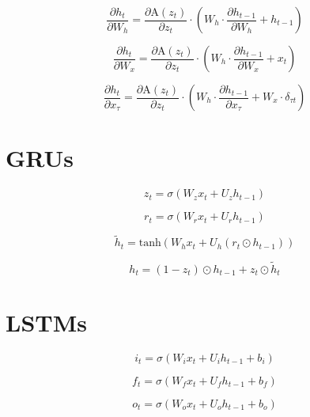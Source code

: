 \documentclass{article}
\begin{document}
\begin{equation}
\frac{\partial h_t}{\partial W_h} = \frac{\partial \text{A}(z_t)}{\partial z_t} \cdot \left( W_h \cdot \frac{\partial h_{t-1}}{\partial W_h} + h_{t-1} \right)
\end{equation}

\begin{equation}
\frac{\partial h_t}{\partial W_x} = \frac{\partial \text{A}(z_t)}{\partial z_t} \cdot \left( W_h \cdot \frac{\partial h_{t-1}}{\partial W_x} + x_t \right)
\end{equation}

\begin{equation}
\frac{\partial h_t}{\partial x_\tau} = \frac{\partial \text{A}(z_t)}{\partial z_t} \cdot \left( W_h \cdot \frac{\partial h_{t-1}}{\partial x_\tau} + W_x \cdot \delta_{\tau t} \right)
\end{equation}

\section{GRUs}

\begin{equation}
z_t = \sigma(W_z x_t + U_z h_{t-1})
\end{equation}

\begin{equation}
r_t = \sigma(W_r x_t + U_r h_{t-1})
\end{equation}

\begin{equation}
\tilde{h}_t = \text{tanh}(W_h x_t + U_h (r_t \odot h_{t-1}))
\end{equation}

\begin{equation}
h_t = (1 - z_t) \odot h_{t-1} + z_t \odot \tilde{h}_t
\end{equation}

\section{LSTMs}

\begin{equation}
i_t = \sigma(W_i x_t + U_i h_{t-1} + b_i)
\end{equation}

\begin{equation}
f_t = \sigma(W_f x_t + U_f h_{t-1} + b_f)
\end{equation}

\begin{equation}
o_t = \sigma(W_o x_t + U_o h_{t-1} + b_o)
\end{equation}
\end{document}

